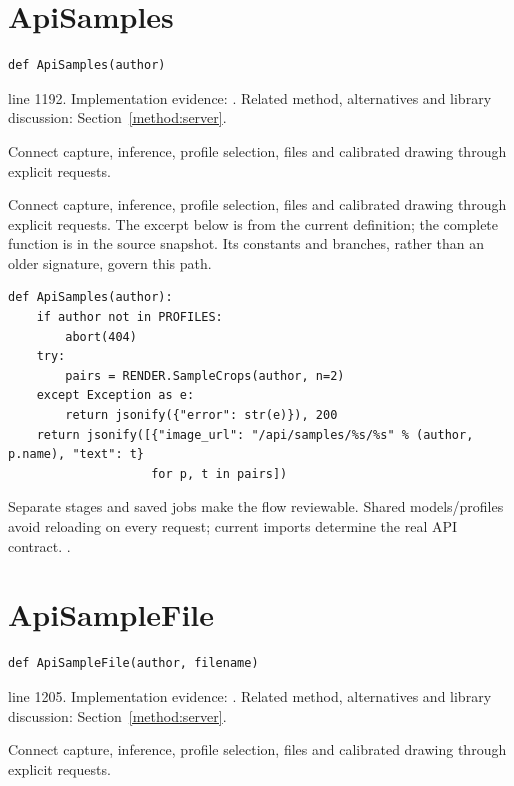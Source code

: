 \section{ApiSamples}\label{fn:web-server:ApiSamples}
\begin{lstlisting}[style=sig]
def ApiSamples(author)
\end{lstlisting}
 line 1192. Implementation evidence: \cite{code2026}. Related method, alternatives and library discussion: Section~\ref{method:server}.


Connect capture, inference, profile selection, files and calibrated drawing through explicit requests.


Connect capture, inference, profile selection, files and calibrated drawing through explicit requests. The excerpt below is from the current definition; the complete function is in the source snapshot. Its constants and branches, rather than an older signature, govern this path.


\begin{lstlisting}[style=plain]
def ApiSamples(author):
    if author not in PROFILES:
        abort(404)
    try:
        pairs = RENDER.SampleCrops(author, n=2)
    except Exception as e:
        return jsonify({"error": str(e)}), 200
    return jsonify([{"image_url": "/api/samples/%s/%s" % (author, p.name), "text": t}
                    for p, t in pairs])
\end{lstlisting}
Separate stages and saved jobs make the flow reviewable. Shared models/profiles avoid reloading on every request; current imports determine the real API contract. \cite{flaskdocs,pillowops,code2026}.


\section{ApiSampleFile}\label{fn:web-server:ApiSampleFile}
\begin{lstlisting}[style=sig]
def ApiSampleFile(author, filename)
\end{lstlisting}
 line 1205. Implementation evidence: \cite{code2026}. Related method, alternatives and library discussion: Section~\ref{method:server}.


Connect capture, inference, profile selection, files and calibrated drawing through explicit requests.


